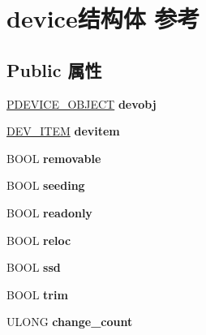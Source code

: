 \hypertarget{structdevice}{}\section{device结构体 参考}
\label{structdevice}
\subsection*{Public 属性}
\begin{DoxyCompactItemize}
\item 
\mbox{\label{structdevice_a8d738e86599c6b107e8fbe1faec2e0b0}} 
\hyperlink{struct___d_e_v_i_c_e___o_b_j_e_c_t}{P\+D\+E\+V\+I\+C\+E\+\_\+\+O\+B\+J\+E\+CT} {\bfseries devobj}
\item 
\mbox{\label{structdevice_a0a6951a013c677023d4ec39416aa6e94}} 
\hyperlink{struct_d_e_v___i_t_e_m}{D\+E\+V\+\_\+\+I\+T\+EM} {\bfseries devitem}
\item 
\mbox{\label{structdevice_a350cacdd87f8990ccb0f5d620e380f58}} 
B\+O\+OL {\bfseries removable}
\item 
\mbox{\label{structdevice_aa69d4af2b0c95cd285a651842d41dca5}} 
B\+O\+OL {\bfseries seeding}
\item 
\mbox{\label{structdevice_a9f91f2b46ff9f75349ca9b84a3a5fc4d}} 
B\+O\+OL {\bfseries readonly}
\item 
\mbox{\label{structdevice_aae7a0de0903b59552520961df63efdbf}} 
B\+O\+OL {\bfseries reloc}
\item 
\mbox{\label{structdevice_a65fbab65e35ddb3f605651440d69af37}} 
B\+O\+OL {\bfseries ssd}
\item 
\mbox{\label{structdevice_aba0bcfbf4f5f8891f2e30ae80eadedb8}} 
B\+O\+OL {\bfseries trim}
\item 
\mbox{\label{structdevice_a3e382546eb7f761ce0fbaa388aa673b1}} 
U\+L\+O\+NG {\bfseries change\+\_\+count}
\item 
\mbox{\label{structdevice_ada886e7cbda490c9bf309fe329747463}} 

\end{DoxyCompactItemize}
